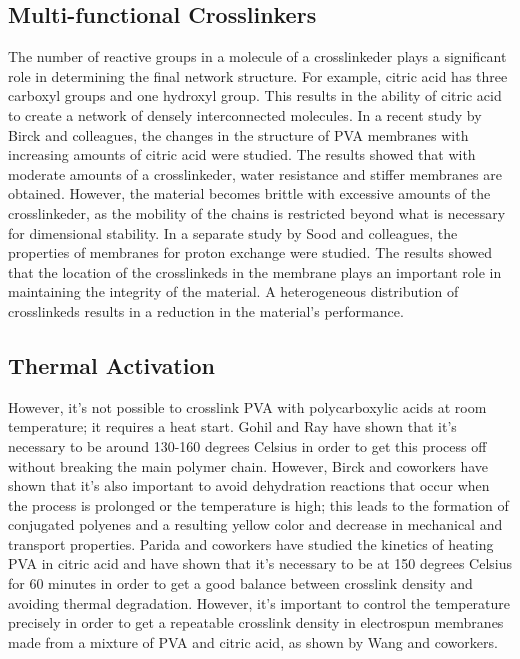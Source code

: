 \documentclass[12pt,a4paper]{report}
\begin{document}
\subsection{Multi-functional Crosslinkers}
The number of reactive groups in a molecule of a crosslinkeder plays a significant role in determining the final network structure. For example, citric acid has three carboxyl groups and one hydroxyl group. This results in the ability of citric acid to create a network of densely interconnected molecules. In a recent study by Birck and colleagues, the changes in the structure of PVA membranes with increasing amounts of citric acid were studied. The results showed that with moderate amounts of a crosslinkeder, water resistance and stiffer membranes are obtained. However, the material becomes brittle with excessive amounts of the crosslinkeder, as the mobility of the chains is restricted beyond what is necessary for dimensional stability. \cite{51}
In a separate study by Sood and colleagues, the properties of membranes for proton exchange were studied. The results showed that the location of the crosslinkeds in the membrane plays an important role in maintaining the integrity of the material. A heterogeneous distribution of crosslinkeds results in a reduction in the material’s performance.\cite{52}

\subsection{Thermal Activation}
However, it’s not possible to crosslink PVA with polycarboxylic acids at room temperature; it requires a heat start. Gohil and Ray have shown that it’s necessary to be around 130-160 degrees Celsius in order to get this process off without breaking the main polymer chain.\cite{34} However, Birck and coworkers have shown that it’s also important to avoid dehydration reactions that occur when the process is prolonged or the temperature is high; this leads to the formation of conjugated polyenes and a resulting yellow color and decrease in mechanical and transport properties.\cite{51} Parida and coworkers have studied the kinetics of heating PVA in citric acid and have shown that it’s necessary to be at 150 degrees Celsius for 60 minutes in order to get a good balance between crosslink density and avoiding thermal degradation.\cite{53} However, it’s important to control the temperature precisely in order to get a repeatable crosslink density in electrospun membranes made from a mixture of PVA and citric acid, as shown by Wang and coworkers.\cite{54}
\end{document}
